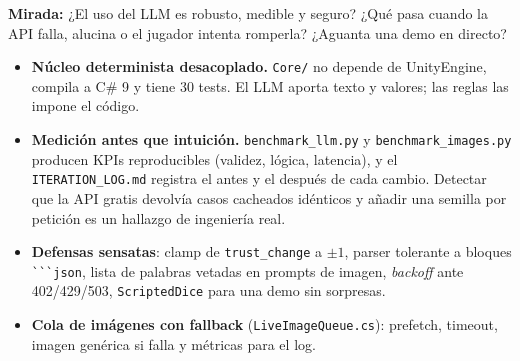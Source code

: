 \documentclass[11pt,a4paper]{article}
\newcommand{\file}[1]{\texttt{\small #1}}
\begin{document}
\begin{perfil}
\textbf{Mirada:} ¿El uso del LLM es robusto, medible y seguro? ¿Qué pasa cuando la API falla,
alucina o el jugador intenta romperla? ¿Aguanta una demo en directo?
\end{perfil}

\begin{fuerte}
\begin{itemize}
\item \textbf{Núcleo determinista desacoplado.} \file{Core/} no depende de UnityEngine, compila a
C\# 9 y tiene 30 tests. El LLM aporta texto y valores; las reglas las impone el código.
\item \textbf{Medición antes que intuición.} \file{benchmark\_llm.py} y \file{benchmark\_images.py}
producen KPIs reproducibles (validez, lógica, latencia), y el \file{ITERATION\_LOG.md} registra el
antes y el después de cada cambio. Detectar que la API gratis devolvía casos cacheados idénticos y
añadir una semilla por petición es un hallazgo de ingeniería real.
\item \textbf{Defensas sensatas}: clamp de \texttt{trust\_change} a $\pm1$, parser tolerante a
bloques \texttt{\`{}\`{}\`{}json}, lista de palabras vetadas en prompts de imagen, \emph{backoff} ante
402/429/503, \texttt{ScriptedDice} para una demo sin sorpresas.
\item \textbf{Cola de imágenes con fallback} (\file{LiveImageQueue.cs}): prefetch, timeout, imagen
genérica si falla y métricas para el log.
\end{itemize}
\end{fuerte}
\end{document}
